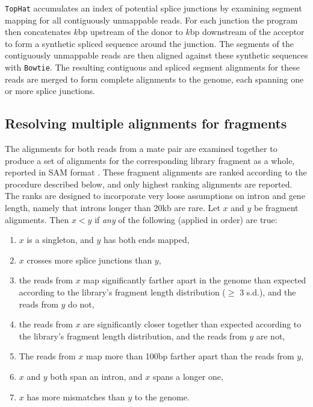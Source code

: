 \documentclass[12pt]{amsart}
\theoremstyle{definition}
\begin{document}
{\tt TopHat} accumulates an index of potential splice junctions by examining
segment mapping for all contiguously unmappable reads. For each junction the
program then concatenates $k$bp upstream of the donor to $k$bp downstream of
the acceptor to form a synthetic spliced sequence around the junction. The
segments of the contiguously unmappable reads are then aligned against these
synthetic sequences with {\tt Bowtie}. The resulting contiguous and spliced
segment alignments for these reads are merged to form complete alignments to
the genome, each spanning one or more splice junctions.

\subsection{Resolving multiple alignments for fragments}

The alignments for both reads from a mate pair are examined together to
produce a set of alignments for the corresponding library fragment as a whole,
reported in SAM format \cite{Li2009a}. These fragment alignments are
ranked according to the procedure described below, and only highest ranking alignments are reported. The ranks are
designed to incorporate very loose assumptions on intron and gene length,
namely that introns longer than 20kb are rare. Let $x$ and $y$ be fragment
alignments. Then $x < y$ if {\em any} of the following (applied in order) are
true:

\begin {enumerate}
    \item $x$ is a singleton, and $y$ has both ends mapped,
    \item $x$ crosses more splice junctions than $y$,
    \item the reads from $x$ map significantly farther apart in the genome than expected according to the library's fragment length distribution ($\geq$ 3 s.d.), and the reads from $y$ do not,
    \item the reads from $x$ are significantly closer together than expected according to the library's fragment length distribution, and the reads from $y$ are not,
    \item The reads from $x$ map more than 100bp farther apart than the reads from $y$,
    \item $x$ and $y$ both span an intron, and $x$ spans a longer one,
    \item $x$ has more mismatches than $y$ to the genome.
\end {enumerate}
\end{document}
